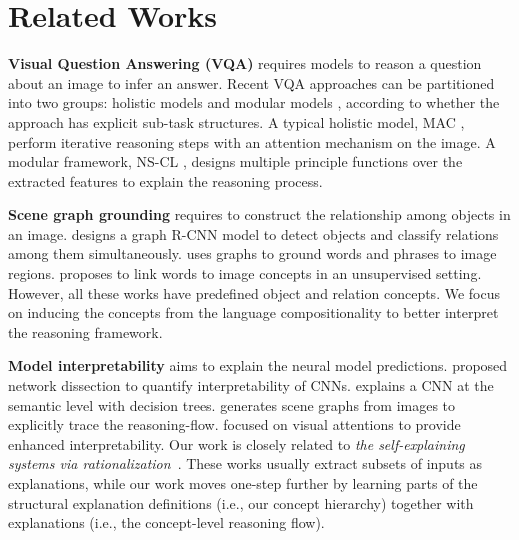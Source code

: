 \documentclass[10pt,twocolumn,letterpaper]{article}
\begin{document}
\section{Related Works}
\vspace{-2mm}
\textbf{Visual Question Answering (VQA)} requires models to reason a question about an image to infer an answer. Recent VQA approaches can be partitioned into two groups: holistic models \cite{yang2016stacked, xu2016ask, anderson2018bottom, perez2018film, hudson2018compositional} and modular models \cite{andreas2016learning, andreas2016neural, hu2017learning, johnson2017inferring, hu2018explainable, yi2018neural, mao2018neuro}, according to whether the approach has explicit sub-task structures. A typical holistic model, MAC \cite{hudson2018compositional}, perform iterative reasoning steps with an attention mechanism on the image.  A modular framework, NS-CL \cite{mao2018neuro}, designs multiple principle functions over the extracted features to explain the reasoning process. 


\textbf{Scene graph grounding} requires to construct the relationship among objects in an image. \cite{yang2018graph} designs a graph R-CNN model to detect objects and classify relations among them simultaneously. \cite{bajaj2019g3raphground} uses graphs to ground words and phrases to image regions. \cite{yeh2018unsupervised} proposes to link words to image concepts in an unsupervised setting. However, all these works have predefined object and relation concepts. We focus on inducing the concepts from the language compositionality to better interpret the reasoning framework.

\textbf{Model interpretability} aims to explain the neural model predictions. \cite{bau2017network} proposed network dissection to quantify interpretability of CNNs. \cite{zhang2019interpreting} explains a CNN at the semantic level with decision trees. \cite{shi2019explainable} generates scene graphs from images to explicitly trace the reasoning-flow. \cite{park2016attentive, hu2018explainable} focused on visual attentions to provide enhanced interpretability. 
Our work is closely related to \emph{the self-explaining systems via rationalization}~\cite{lei2016rationalizing,chen2018learning,yu2019rethinking}.
These works usually extract subsets of inputs as explanations, while our work moves one-step further by learning parts of the structural explanation definitions (i.e., our concept hierarchy) together with explanations (i.e., the concept-level reasoning flow).
\end{document}

